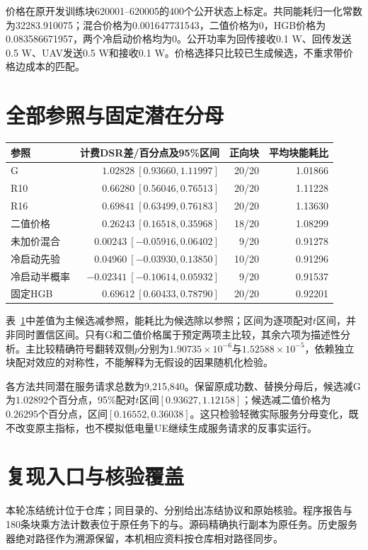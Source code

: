 价格在原开发训练块620001--620005的400个公开状态上标定。共同能耗归一化常数为32283.910075；混合价格为0.001647731543，二值价格为0，HGB价格为0.083586671957，两个冷启动价格均为0。公开功率为回传接收0.1 W、回传发送0.5 W、UAV发送0.5 W和接收0.1 W。价格选择只比较已生成候选，不重求带价格边成本的匹配。

\section{全部参照与固定潜在分母}
\begin{table}[!htbp]
\centering
{}
\label{tab:cost-all-contrasts}
\small
\begin{tabular}{lrrr}
\toprule
参照 & 计费DSR差/百分点及95\%区间 & 正向块 & 平均块能耗比\\
\midrule
G & $1.02828\ [0.93660,1.11997]$ & 20/20 & 1.01866\\
R10 & $0.66280\ [0.56046,0.76513]$ & 20/20 & 1.11228\\
R16 & $0.69841\ [0.63499,0.76183]$ & 20/20 & 1.13630\\
二值价格 & $0.26243\ [0.16518,0.35968]$ & 18/20 & 1.08299\\
未加价混合 & $0.00243\ [-0.05916,0.06402]$ & 9/20 & 0.91278\\
冷启动先验 & $0.04960\ [-0.03930,0.13850]$ & 10/20 & 0.91296\\
冷启动半概率 & $-0.02341\ [-0.10614,0.05932]$ & 9/20 & 0.91537\\
固定HGB & $0.69612\ [0.60433,0.78790]$ & 20/20 & 0.92201\\
\bottomrule
\end{tabular}
\end{table}
表~\ref{tab:cost-all-contrasts}中差值为主候选减参照，能耗比为候选除以参照；区间为逐项配对$t$区间，并非同时置信区间。只有G和二值价格属于预定两项主比较，其余六项为描述性分析。主比较精确符号翻转双侧$p$分别为$1.90735\times10^{-6}$与$1.52588\times10^{-5}$，依赖独立块配对效应的对称性，不能解释为无假设的因果随机化检验。

各方法共同潜在服务请求总数为9,215,840。保留原成功数、替换分母后，候选减G为$1.02892$个百分点，95\%配对$t$区间$[0.93627,1.12158]$；候选减二值价格为$0.26295$个百分点，区间$[0.16552,0.36038]$。这只检验轻微实际服务分母变化，既不改变原主指标，也不模拟低电量UE继续生成服务请求的反事实运行。

\section{复现入口与核验覆盖}
本轮冻结统计位于仓库\allowbreak{}；同目录的、分别给出冻结协议和原始核验。程序报告与180条块乘方法计数表位于原任务下的与。源码精确执行副本为原任务。历史服务器绝对路径作为溯源保留，本机相应资料按仓库相对路径同步。

